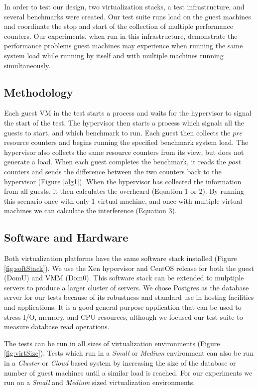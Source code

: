 In order to test our design, two virtualization stacks, a test infrastructure, and several benchmarks were created.  Our test suite runs load on the guest machines and coordinate the stop and start of the collection of multiple performance counters.     
Our experiments, when run in this infrastructure, demonstrate the performance problems guest machines may experience when running the same system load while running by itself and with multiple machines running simultaneously.  

\subsection{Methodology}
Each guest VM in the test starts a process and waits for the hypervisor to signal the start of the test.  
The hypervisor then starts a process which signals all the guests to start, and which benchmark to run.  
Each guest then collects the $pre$ resource counters and begins running the specified benchmark system load.  
The hypervisor also collects the same resource counters from its view, but does not generate a load.  
When each guest completes the benchmark, it reads the $post$ counters and sends the difference between the two counters back to the hypervisor (Figure \ref{alg1}).
When the hypervisor has collected the information from all guests, it then calculates the overheard (Equation 1 or 2).
By running this scenario once with only 1 virtual machine, and once with multiple virtual machines we can calculate the interference (Equation 3).

\subsection{Software and Hardware}
\indent Both virtualization platforms have the same software stack installed (Figure \ref{fig:softStack}).  
We use the Xen hypervisor and CentOS release for both the guest (DomU) and VMM (Dom0).  
This software stack can be extended to mulptiple servers to produce a larger cluster of servers.  
We chose Postgres as the database server for our tests because of its robustness and standard use in hosting facilities and applications.  
It is a good general purpose application that can be used to stress I/O, memory, and CPU resources, although we focused our test suite to measure database read operations.

\indent The tests can be run in all sizes of virtualization environments (Figure \ref{fig:virtSize}).  
Tests which run in a \emph{Small} or \emph{Medium} environment can also be run in a \emph{Cluster} or \emph{Cloud} based system by increasing the size of the database or number of guest machines until a similar load is reached.  
For our experiments we run on a \emph{Small} and \emph{Medium} sized virtualization environments. 

